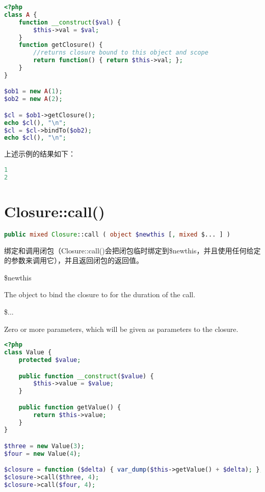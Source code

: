 \begin{lstlisting}[language=PHP]
<?php
class A {
    function __construct($val) {
        $this->val = $val;
    }
    function getClosure() {
        //returns closure bound to this object and scope
        return function() { return $this->val; };
    }
}

$ob1 = new A(1);
$ob2 = new A(2);

$cl = $ob1->getClosure();
echo $cl(), "\n";
$cl = $cl->bindTo($ob2);
echo $cl(), "\n";
\end{lstlisting}

上述示例的结果如下：

\begin{lstlisting}[language=PHP]
1
2
\end{lstlisting}

\section{Closure::call()}




\begin{lstlisting}[language=PHP]
public mixed Closure::call ( object $newthis [, mixed $... ] )
\end{lstlisting}

绑定和调用闭包（Closure::call()会把闭包临时绑定到\$newthis，并且使用任何给定的参数来调用它），并且返回闭包的返回值。

\begin{compactitem}
\item \$newthis

The object to bind the closure to for the duration of the call.

\item \$...

Zero or more parameters, which will be given as parameters to the closure.

\end{compactitem}



\begin{lstlisting}[language=PHP]
<?php
class Value {
    protected $value;

    public function __construct($value) {
        $this->value = $value;
    }

    public function getValue() {
        return $this->value;
    }
}

$three = new Value(3);
$four = new Value(4);

$closure = function ($delta) { var_dump($this->getValue() + $delta); };
$closure->call($three, 4);
$closure->call($four, 4);
\end{lstlisting}

